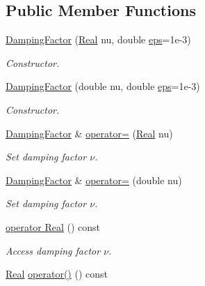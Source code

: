 \subsection*{Public Member Functions}
\begin{DoxyCompactItemize}
\item 
\hyperlink{classSpacy_1_1DampingFactor_a03128fa4d2d17bd2024eaaff5a6cf03a}{Damping\+Factor} (\hyperlink{classSpacy_1_1Real}{Real} nu, double \hyperlink{classSpacy_1_1Mixin_1_1Eps_a40e2ba8f3abd2b5370ef41238cfaaf8b}{eps}=1e-\/3)
\begin{DoxyCompactList}\small\item\em Constructor. \end{DoxyCompactList}\item 
\hyperlink{classSpacy_1_1DampingFactor_a9e94f7d54ef502b804da36bde0ced9fe}{Damping\+Factor} (double nu, double \hyperlink{classSpacy_1_1Mixin_1_1Eps_a40e2ba8f3abd2b5370ef41238cfaaf8b}{eps}=1e-\/3)
\begin{DoxyCompactList}\small\item\em Constructor. \end{DoxyCompactList}\item 
\hyperlink{classSpacy_1_1DampingFactor}{Damping\+Factor} \& \hyperlink{classSpacy_1_1DampingFactor_a214beda25cc00fbe6c953308ba1ca9b3}{operator=} (\hyperlink{classSpacy_1_1Real}{Real} nu)
\begin{DoxyCompactList}\small\item\em Set damping factor $\nu$. \end{DoxyCompactList}\item 
\hyperlink{classSpacy_1_1DampingFactor}{Damping\+Factor} \& \hyperlink{classSpacy_1_1DampingFactor_a6790524473c91d6534ff93597fae3685}{operator=} (double nu)
\begin{DoxyCompactList}\small\item\em Set damping factor $\nu$. \end{DoxyCompactList}\item 
\hypertarget{classSpacy_1_1DampingFactor_ab2f626689cc8907bd9da2635e0bbd572}{}\hyperlink{classSpacy_1_1DampingFactor_ab2f626689cc8907bd9da2635e0bbd572}{operator Real} () const \label{classSpacy_1_1DampingFactor_ab2f626689cc8907bd9da2635e0bbd572}

\begin{DoxyCompactList}\small\item\em Access damping factor $\nu$. \end{DoxyCompactList}\item 
\hypertarget{classSpacy_1_1DampingFactor_aa14911dc85380f66fdb3541935cf893c}{}\hyperlink{classSpacy_1_1Real}{Real} \hyperlink{classSpacy_1_1DampingFactor_aa14911dc85380f66fdb3541935cf893c}{operator()} () const \label{classSpacy_1_1DampingFactor_aa14911dc85380f66fdb3541935cf893c}


\end{DoxyCompactItemize}
